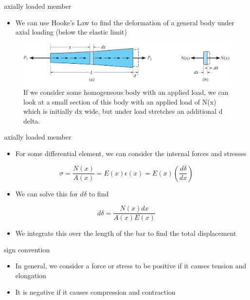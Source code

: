 \documentclass[
  letterpaper,
  ignorenonframetext,
  aspectratio=43,
  handout,
  12pt]{beamer}
\providecommand{\tightlist}{%
  \setlength{\itemsep}{0pt}\setlength{\parskip}{0pt}}
\providecommand{\tightlist}{%
\setlength{\itemsep}{0pt}\setlength{\parskip}{0pt}}
\let\Oldincludegraphics\includegraphics
\renewcommand{\includegraphics}[2][]{\Oldincludegraphics[width=\textwidth,height=0.7\textheight,keepaspectratio]{#2}}
\begin{document}
\begin{frame}{axially loaded member}
\protect\hypertarget{axially-loaded-member}{}
\begin{itemize}
\tightlist
\item
  We can use Hooke's Law to find the deformation of a general body under
  axial loading (below the elastic limit)
\end{itemize}

\begin{figure}
\centering
\includegraphics{../images/axial-load.jpg}
\caption{If we consider some homogeneous body with an applied load, we
can look at a small section of this body with an applied load of N(x)
which is initially dx wide, but under load stretches an additional d
delta.}
\end{figure}
\end{frame}

\begin{frame}{axially loaded member}
\protect\hypertarget{axially-loaded-member-1}{}
\begin{itemize}
\tightlist
\item
  For some differential element, we can consider the internal forces and
  stresses
\end{itemize}

\[\sigma = \frac{N(x)}{A(x)} = E(x) \epsilon(x) = E(x) \left(\frac{d\delta}{dx}\right)\]

\begin{itemize}
\tightlist
\item
  We can solve this for \(d\delta\) to find
\end{itemize}

\[d \delta = \frac{N(x) dx}{A(x)E(x)}\]

\begin{itemize}
\tightlist
\item
  We integrate this over the length of the bar to find the total
  displacement
\end{itemize}
\end{frame}

\begin{frame}{sign convention}
\protect\hypertarget{sign-convention}{}
\begin{itemize}
\tightlist
\item
  In general, we consider a force or stress to be positive if it causes
  tension and elongation
\item
  It is negative if it causes compression and contraction
\end{itemize}
\end{frame}
\end{document}
